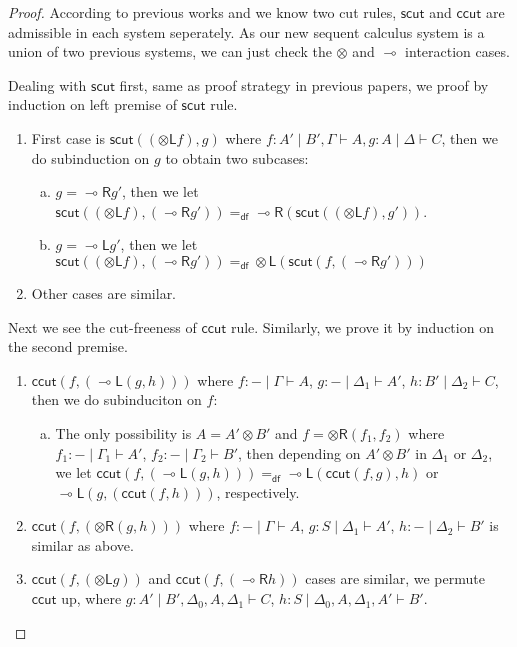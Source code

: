 \documentclass{article}
\newtheorem*{proof}{Proof : }
\newcommand{\tl}{\otimes \mathsf{L}}
\newcommand{\tr}{\otimes \mathsf{R}}
\newcommand{\lright}{\multimap \mathsf{R}}
\newcommand{\lleft}{\multimap \mathsf{L}}
\newcommand{\ot}{\otimes}
\newcommand{\lolli}{\multimap}
\newcommand{\defeq}{=_{\mathsf{df}}}
\begin{document}
\begin{proof}
  According to previous works \cite{uustalu_sequent_2018} and \cite{uustalu_deductive_nodate} we know two cut rules, $\mathsf{scut}$ and $\mathsf{ccut}$ are admissible in each system seperately.
  As our new sequent calculus system is a union of two previous systems, we can just check the $\ot$ and $\lolli$ interaction cases.

  Dealing with $\mathsf{scut}$ first, same as proof strategy in previous papers, we proof by induction on left premise of $\mathsf{scut}$ rule.
  \begin{enumerate}[1. ]
    \item First case is $\mathsf{scut} ((\tl f), g)$ where $f : A' \mid B' , \Gamma \vdash A, g : A \mid \Delta \vdash C$, then we do subinduction on $g$ to obtain two subcases:
          \begin{enumerate}[a. ]
            \item $g = \lright g'$, then we let $\mathsf{scut} ((\tl f), (\lright g')) \defeq \lright (\mathsf{scut} ((\tl f), g'))$.
            \item $g = \lleft g'$, then we let $\mathsf{scut} ((\tl f), (\lright g')) \defeq \tl (\mathsf{scut} (f, (\lright g')))$
          \end{enumerate}
    \item Other cases are similar.
  \end{enumerate}
  Next we see the cut-freeness of $\mathsf{ccut}$ rule.
  Similarly, we prove it by induction on the second premise.
  \begin{enumerate}[1. ]
    \item $\mathsf{ccut} (f , (\lleft (g, h)))$ where $f : - \mid \Gamma \vdash A$, $g : - \mid \Delta_1 \vdash A'$, $h : B' \mid \Delta_2 \vdash C$, then we do subinduciton on $f$:
    \begin{enumerate}[a. ]
      \item The only possibility is $A = A' \ot B'$ and $f = \tr (f_1, f_2)$ where $f_1 : - \mid \Gamma_1 \vdash A'$, $f_2 : - \mid \Gamma_2 \vdash B'$, then depending on $A' \ot B'$ in $\Delta_1$ or $\Delta_2$,
      we let $\mathsf{ccut} (f , (\lleft (g, h))) \defeq \lleft (\mathsf{ccut} (f, g), h)$ or $ \lleft (g, (\mathsf{ccut} (f, h)))$, respectively.
    \end{enumerate}
    \item $\mathsf{ccut} (f , (\tr (g, h)))$ where $f : - \mid \Gamma \vdash A$, $g : S \mid \Delta_1 \vdash A'$, $h : - \mid \Delta_2 \vdash B'$ is similar as above.
    \item $\mathsf{ccut} (f, (\tl g))$ and
    $\mathsf{ccut} (f, (\lright h))$ cases are similar, we permute $\mathsf{ccut}$ up,
    where $g : A' \mid B' , \Delta_0 , A , \Delta_1 \vdash C$, $h : S \mid \Delta_0 , A , \Delta_1 , A' \vdash B'$.
  \end{enumerate}
\end{proof}
\end{document}
